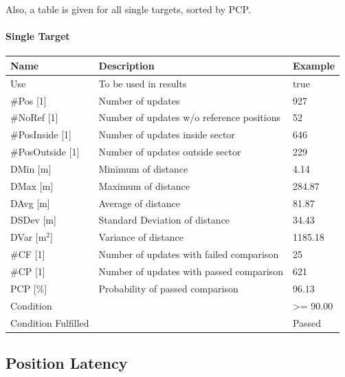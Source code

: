 Also, a table is given for all single targets, sorted by PCP.

\paragraph{Single Target}

\begin{center}
 \begin{table}[H]
  \begin{tabularx}{\textwidth}{ | l | X |  l | }
    \hline
    \textbf{Name} & \textbf{Description} & \textbf{Example} \\ \hline
    Use & To be used in results & true \\ \hline
    \#Pos [1] & Number of updates & 927 \\ \hline
    \#NoRef [1] & Number of updates w/o reference positions & 52 \\ \hline
    \#PosInside [1] & Number of updates inside sector & 646 \\ \hline
    \#PosOutside [1] & Number of updates outside sector & 229 \\ \hline
    DMin [m] & Minimum of distance & 4.14 \\ \hline
    DMax [m] & Maximum of distance & 284.87 \\ \hline
    DAvg [m] & Average of distance & 81.87 \\ \hline
    DSDev [m] & Standard Deviation of distance & 34.43 \\ \hline
    DVar [m$^2$] & Variance of distance & 1185.18 \\ \hline
    \#CF [1] & Number of updates with failed comparison & 25 \\ \hline
    \#CP [1] & Number of updates with  passed comparison & 621 \\ \hline
    PCP [\%] & Probability of passed comparison & 96.13 \\ \hline
    Condition &  & >= 90.00 \\ \hline
    Condition Fulfilled &  & Passed \\ \hline
\end{tabularx}
\end{table}
\end{center}

\subsection{Position Latency}
\label{sec:eval_req_pos_latency} 

